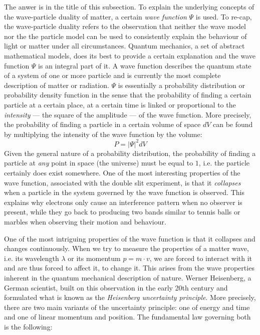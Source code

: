 
The anwer is in the title of this subsection. To explain the underlying concepts of the wave-particle duality of matter, a certain \emph{wave function} $\Psi$ is used. To re-cap, the wave-particle duality refers to the observation that neither the wave model nor the the particle model can be used to consistently explain the behaviour of light or matter under all circumstances. Quantum mechanics, a set of abstract mathematical models, does its best to provide a certain explanation and the wave function $\Psi$ is an integral part of it. A wave function describes the quantum state of a system of one or more particle and is currently the most complete description of matter or radiation. $\Psi$ is essentially a probability distribution or probability density function in the sense that the probability of finding a certain particle at a certain place, at a certain time is linked or proportional to the \emph{intensity} --- the square of the amplitude --- of the wave function. More precisely, the probability of finding a particle in a certain volume of space $dV$ can be found by multiplying the intensity of the wave function by the volume: $$P = |\Psi|^2 dV$$ Given the general nature of a probability distribution, the probability of finding a particle at \emph{any} point in space (the universe) must be equal to $1$, i.e. the particle certainly does exist somewhere. One of the most interesting properties of the wave function, associated with the double slit experiment, is that it \emph{collapses} when a particle in the system governed by the wave function is observed. This explains why electrons only cause an interference pattern when no observer is present, while they go back to producing two bands similar to tennis balls or marbles when observing their motion and behaviour.

\pagebreak


One of the most intriguing properties of the wave function is that it collapses and changes continuously. When we try to measure the properties of a matter wave, i.e. its wavelength $\lambda$ or its momentum $p = m \cdot v$, we are forced to interact with it and are thus forced to affect it, to change it. This arises from the wave properties inherent in the quantum mechanical description of nature. Werner Heisenberg, a German scientist, built on this observation in the early 20th century and formulated what is known as the \emph{Heisenberg uncertainty principle}. More precisely, there are two main variants of the uncertainty principle: one of energy and time and one of linear momentum and position. The fundamental law governing both is the following:

